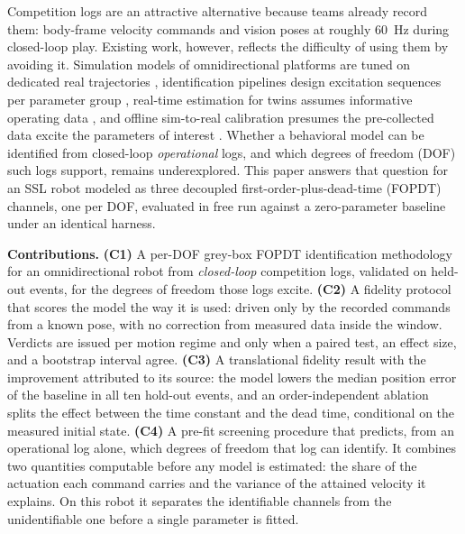 Competition logs are an attractive alternative because teams already record them: body-frame velocity commands and vision poses at roughly \SI{60}{Hz} during closed-loop play. Existing work, however, reflects the difficulty of using them by avoiding it. Simulation models of omnidirectional platforms are
tuned on dedicated real trajectories \cite{wiedemann2024simulation,wiedemann2025automated}, identification pipelines design excitation sequences per parameter group \cite{giro2023otbot}, real-time
estimation for twins assumes informative operating data \cite{kosmaga2026digital}, and offline sim-to-real calibration presumes the pre-collected data excite the parameters of interest \cite{tiboni2023dropo}. Whether a behavioral model can be identified from closed-loop \emph{operational} logs, and which degrees of freedom (DOF) such logs support, remains underexplored. This paper answers that question for an SSL robot modeled as three decoupled first-order-plus-dead-time (FOPDT) channels, one per DOF, evaluated in free run against a zero-parameter baseline under an identical harness.

\noindent\textbf{Contributions.}
\textbf{(C1)} A per-DOF grey-box FOPDT identification methodology for an omnidirectional robot from \emph{closed-loop} competition logs, validated on held-out events, for the degrees of freedom those logs excite. 
\textbf{(C2)} A fidelity protocol that scores the model the way it is used: driven only by the recorded commands from a known pose, with no correction from measured data inside the window. Verdicts are issued per motion regime and only when a paired test, an effect size, and a bootstrap interval agree.
\textbf{(C3)} A translational fidelity result with the improvement attributed to its source: the model lowers the median position error of the baseline in all ten hold-out events, and an order-independent ablation splits the effect between the time constant and the dead time, conditional on the measured initial state.
\textbf{(C4)} A pre-fit screening procedure that predicts, from an operational log alone, which degrees of freedom that log can identify. It combines two quantities computable before any model is estimated: the share of the actuation each command carries and the variance of the attained velocity it explains. On this robot it separates the identifiable channels from the unidentifiable one before a single parameter is fitted.
